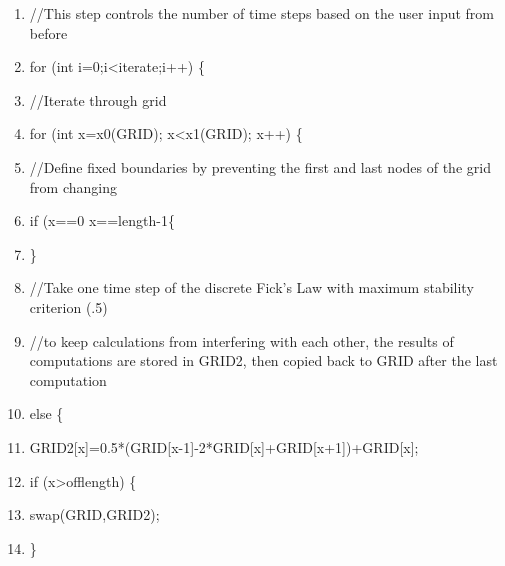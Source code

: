 \documentclass{article}
\begin{document}
\begin{shadebox}
\begin{enumerate} \itemsep1pt \parskip0pt 
\setcounter{enumi}{37}
\item //This step controls the number of time steps based on the user input from before
\item for (int i=0;i\textless iterate;i++) \{
\item //Iterate through grid
\item \hspace{10pt}        for (int x=x0(GRID); x\textless x1(GRID); x++) \{
\item //Define fixed boundaries by preventing the first and last nodes of the grid from changing
\item \hspace{10pt} \hspace{10pt}                if (x==0 \textbar \textbar x==length-1\{
\item \hspace{10pt} \hspace{10pt}                 \}
\item //Take one time step of the discrete Fick's Law with maximum stability criterion (.5)
\item //to keep calculations from interfering with each other, the results of computations are stored in GRID2, then copied back to GRID after the last computation
\item \hspace{10pt} \hspace{10pt}                 else \{
\item \hspace{10pt} \hspace{10pt} \hspace{10pt}                         GRID2[x]=0.5*(GRID[x-1]-2*GRID[x]+GRID[x+1])+GRID[x];
\item \hspace{10pt} \hspace{10pt} \hspace{10pt}                         if (x\textgreater offlength) \{
\item \hspace{10pt} \hspace{10pt} \hspace{10pt} \hspace{10pt}                                 swap(GRID,GRID2);
\item \hspace{10pt} \hspace{10pt} \hspace{10pt}                         \}

\end{enumerate}
\end{shadebox}
\end{document}
